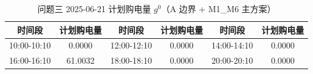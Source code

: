 \begin{table}[htbp]
\centering
\caption{问题三 2025-06-21 计划购电量 $g^0$（A 边界 + M1\_M6 主方案）}\label{tab:q3-purchase}
\normalsize\setlength{\tabcolsep}{5pt}
\begin{tabular}{@{}cccccc@{}}
\toprule
时间段 & 计划购电量 & 时间段 & 计划购电量 & 时间段 & 计划购电量 \\
\midrule
10:00-10:10 & 0.0000 & 12:00-12:10 & 0.0000 & 14:00-14:10 & 0.0000 \\
16:00-16:10 & 61.0032 & 18:00-18:10 & 0.0000 & 20:00-20:10 & 0.0000 \\
\bottomrule
\end{tabular}
\end{table}
